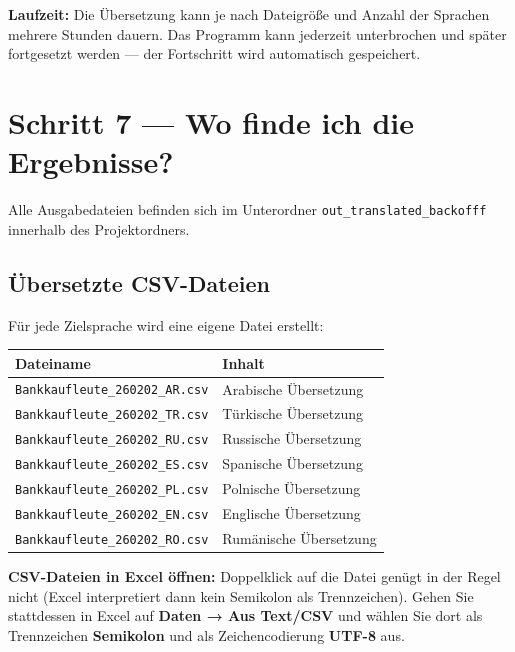 \documentclass[a4paper,11pt]{article}
\newenvironment{hinweisbox}{%
  \begin{mdframed}[backgroundcolor=hinweis,linecolor=hinweisrand,linewidth=1pt,
    innerleftmargin=8pt,innerrightmargin=8pt,innertopmargin=6pt,innerbottommargin=6pt]
  \small}{%
  \end{mdframed}}
\begin{document}
\begin{hinweisbox}
\textbf{Laufzeit:} Die Übersetzung kann je nach Dateigröße und Anzahl der Sprachen
mehrere Stunden dauern. Das Programm kann jederzeit unterbrochen und später
fortgesetzt werden — der Fortschritt wird automatisch gespeichert.
\end{hinweisbox}

\section{Schritt 7 — Wo finde ich die Ergebnisse?}

Alle Ausgabedateien befinden sich im Unterordner \texttt{out\_translated\_backofff}
innerhalb des Projektordners.

\subsection{Übersetzte CSV-Dateien}

Für jede Zielsprache wird eine eigene Datei erstellt:

\begin{center}
\begin{tabularx}{0.85\textwidth}{@{}l X@{}}
\toprule
\textbf{Dateiname} & \textbf{Inhalt} \\
\midrule
\texttt{Bankkaufleute\_260202\_AR.csv} & Arabische Übersetzung \\
\texttt{Bankkaufleute\_260202\_TR.csv} & Türkische Übersetzung \\
\texttt{Bankkaufleute\_260202\_RU.csv} & Russische Übersetzung \\
\texttt{Bankkaufleute\_260202\_ES.csv} & Spanische Übersetzung \\
\texttt{Bankkaufleute\_260202\_PL.csv} & Polnische Übersetzung \\
\texttt{Bankkaufleute\_260202\_EN.csv} & Englische Übersetzung \\
\texttt{Bankkaufleute\_260202\_RO.csv} & Rumänische Übersetzung \\
\bottomrule
\end{tabularx}
\end{center}

\begin{hinweisbox}
\textbf{CSV-Dateien in Excel öffnen:} Doppelklick auf die Datei genügt in der Regel
nicht (Excel interpretiert dann kein Semikolon als Trennzeichen). Gehen Sie stattdessen
in Excel auf \textbf{Daten → Aus Text/CSV} und wählen Sie dort als Trennzeichen
\textbf{Semikolon} und als Zeichencodierung \textbf{UTF-8} aus.
\end{hinweisbox}
\end{document}

